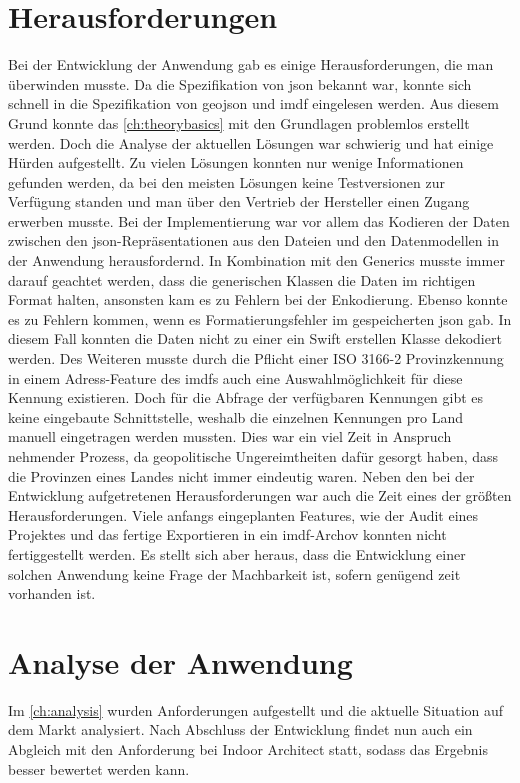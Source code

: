 \section{Herausforderungen}
Bei der Entwicklung der Anwendung gab es einige Herausforderungen, die man überwinden musste.
Da die Spezifikation von \ac{json} bekannt war, konnte sich schnell in die Spezifikation von \ac{geojson} und \ac{imdf} eingelesen werden.
Aus diesem Grund konnte das \autoref{ch:theorybasics} mit den Grundlagen problemlos erstellt werden.
Doch die Analyse der aktuellen Lösungen war schwierig und hat einige Hürden aufgestellt.
Zu vielen Lösungen konnten nur wenige Informationen gefunden werden, da bei den meisten Lösungen keine Testversionen zur Verfügung standen und man über den Vertrieb der Hersteller einen Zugang erwerben musste.\pbreak%
%
Bei der Implementierung war vor allem das Kodieren der Daten zwischen den \ac{json}-Repräsentationen aus den Dateien und den Datenmodellen in der Anwendung herausfordernd.
In Kombination mit den Generics musste immer darauf geachtet werden, dass die generischen Klassen die Daten im richtigen Format halten, ansonsten kam es zu Fehlern bei der Enkodierung.
Ebenso konnte es zu Fehlern kommen, wenn es Formatierungsfehler im gespeicherten \ac{json} gab.
In diesem Fall konnten die Daten nicht zu einer ein Swift erstellen Klasse dekodiert werden.
Des Weiteren musste durch die Pflicht einer ISO 3166-2 Provinzkennung in einem Adress-Feature des \acl{imdf}s auch eine Auswahlmöglichkeit für diese Kennung existieren.
Doch für die Abfrage der verfügbaren Kennungen gibt es keine eingebaute Schnittstelle, weshalb die einzelnen Kennungen pro Land manuell eingetragen werden mussten.
Dies war ein viel Zeit in Anspruch nehmender Prozess, da geopolitische Ungereimtheiten dafür gesorgt haben, dass die Provinzen eines Landes nicht immer eindeutig waren.\pbreak%
%
Neben den bei der Entwicklung aufgetretenen Herausforderungen war auch die Zeit eines der größten Herausforderungen.
Viele anfangs eingeplanten Features, wie der Audit eines Projektes und das fertige Exportieren in ein \ac{imdf}-Archov konnten nicht fertiggestellt werden.
Es stellt sich aber heraus, dass die Entwicklung einer solchen Anwendung keine Frage der Machbarkeit ist, sofern genügend zeit vorhanden ist.

\section{Analyse der Anwendung}
Im \autoref{ch:analysis} wurden Anforderungen aufgestellt und die aktuelle Situation auf dem Markt analysiert.
Nach Abschluss der Entwicklung findet nun auch ein Abgleich mit den Anforderung bei Indoor Architect statt, sodass das Ergebnis besser bewertet werden kann.

